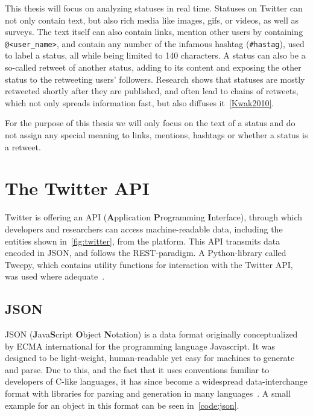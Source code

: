 \par
This thesis will focus on analyzing statuses in real time.
Statuses on Twitter can not only contain text, but also rich media like images, gifs, or videos, as well as surveys.
The text itself can also contain links, mention other users by containing \texttt{@<user\_name>},
and contain any number of the infamous hashtag (\texttt{\#hastag}), used to label a status, all while being limited to 140 characters.
A status can also be a so-called retweet of another status, adding to its content and exposing the other status to the retweeting users' followers.
Research shows that statuses are mostly retweeted shortly after they are published, and often lead to chains of retweets,
which not only spreads information fast, but also diffuses it~\ref{Kwak2010}.\\
\par
For the purpose of this thesis we will only focus on the text of a status and do not assign any special meaning to links,
mentions, hashtags or whether a status is a retweet.\\

\section{The Twitter API}
\label{sec:theApi}

Twitter is offering an API (\textbf{A}pplication \textbf{P}rogramming \textbf{I}nterface),
through which developers and researchers can access machine-readable data,
including the entities shown in~\ref{fig:twitter}, from the platform.
This API transmits data encoded in JSON, and follows the REST-paradigm.
A Python-library called Tweepy, which contains utility functions for interaction with the Twitter API, was used where adequate~\cite{tweepyDocs}.

\subsection{JSON}
\label{subsec:json}

JSON (\textbf{J}ava\textbf{S}cript \textbf{O}bject \textbf{N}otation) is a data format originally conceptualized by ECMA international
for the programming language Javascript.
It was designed to be light-weight, human-readable yet easy for machines to generate and parse.
Due to this, and the fact that it uses conventions familiar to developers of C-like languages,
it has since become a widespread data-interchange format with libraries for parsing and generation in many languages~\cite{jsonDocs}.
A small example for an object in this format can be seen in~\ref{code:json}.


